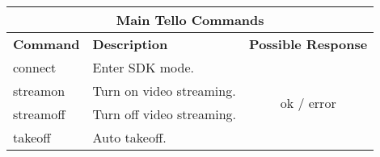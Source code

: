 \begin{table}[H]
    \centering
	\begin{tabular}{@{}|llc|@{}}
		\toprule
		\multicolumn{3}{|c|}{\textbf{Main Tello Commands}}                                                                                                                                                                                                                                                                                                                      \\ \midrule
		\multicolumn{1}{|l|}{\textbf{Command}}  & \multicolumn{1}{l|}{\textbf{Description}}                                                                                                                                                                                                                                   & \multicolumn{1}{l|}{\textbf{Possible Response}} \\ \midrule
		\multicolumn{1}{|l|}{connect}           & \multicolumn{1}{l|}{Enter SDK mode.}                                                                                                                                                                                                                                        & \multirow{6}{*}{ok / error}                     \\ \cmidrule(r){1-2}
		\multicolumn{1}{|l|}{streamon}          & \multicolumn{1}{l|}{Turn on video streaming.}                                                                                                                                                                                                                               &                                                 \\ \cmidrule(r){1-2}
		\multicolumn{1}{|l|}{streamoff}         & \multicolumn{1}{l|}{Turn off video streaming.}                                                                                                                                                                                                                              &                                                 \\ \cmidrule(r){1-2}
		\multicolumn{1}{|l|}{takeoff}           & \multicolumn{1}{l|}{Auto takeoff.}                                                                                                                                                                                                                                          &                                                 \\ \cmidrule(r){1-2}

\end{tabular}
\end{table}
